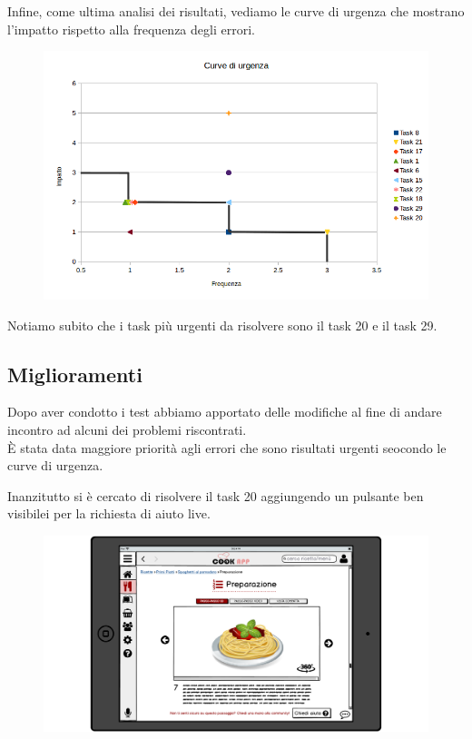 Infine, come ultima analisi dei risultati, vediamo le curve di urgenza
che mostrano l'impatto rispetto alla frequenza degli errori.

\begin{figure}[H]
	\includegraphics[width=\linewidth]{img/curve-urgenza.png}
\end{figure}

Notiamo subito che i task più urgenti da risolvere sono il task 20 e il
task 29.

\subsection{Miglioramenti}
Dopo aver condotto i test abbiamo apportato delle modifiche al fine di
andare incontro ad alcuni dei problemi riscontrati.\\
È stata data maggiore priorità agli errori che sono risultati urgenti
seocondo le curve di urgenza.

Inanzitutto si è cercato di risolvere il task 20 aggiungendo un pulsante
ben visibilei per la richiesta di aiuto live.\\


\begin{figure}[H]
	\includegraphics[width=\linewidth]{img/mockup/Ricetta3-fixed.png}
\end{figure}

